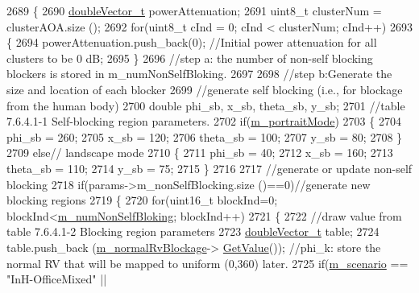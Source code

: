 \begin{DoxyCode}
2689 \{
2690         \hyperlink{namespacens3_aa6f1edf6566ca6afec613bc6e40240ea}{doubleVector\_t} powerAttenuation;
2691         uint8\_t clusterNum = clusterAOA.size ();
2692         \textcolor{keywordflow}{for}(uint8\_t cInd = 0; cInd < clusterNum; cInd++)
2693         \{
2694                 powerAttenuation.push\_back(0); \textcolor{comment}{//Initial power attenuation for all clusters to be 0 dB;}
2695         \}
2696         \textcolor{comment}{//step a: the number of non-self blocking blockers is stored in m\_numNonSelfBloking.}
2697 
2698         \textcolor{comment}{//step b:Generate the size and location of each blocker}
2699         \textcolor{comment}{//generate self blocking (i.e., for blockage from the human body)}
2700         \textcolor{keywordtype}{double} phi\_sb, x\_sb, theta\_sb, y\_sb;
2701         \textcolor{comment}{//table 7.6.4.1-1 Self-blocking region parameters.}
2702         \textcolor{keywordflow}{if}(\hyperlink{classns3_1_1MmWave3gppChannel_a013ed012d87114993312ccfd172fe377}{m\_portraitMode})
2703         \{
2704                 phi\_sb = 260;
2705                 x\_sb = 120;
2706                 theta\_sb = 100;
2707                 y\_sb = 80;
2708         \}
2709         \textcolor{keywordflow}{else}\textcolor{comment}{// landscape mode}
2710         \{
2711                 phi\_sb = 40;
2712                 x\_sb = 160;
2713                 theta\_sb = 110;
2714                 y\_sb = 75;
2715         \}
2716 
2717         \textcolor{comment}{//generate or update non-self blocking}
2718         \textcolor{keywordflow}{if}(params->m\_nonSelfBlocking.size ()==0)\textcolor{comment}{//generate new blocking regions}
2719         \{
2720                 \textcolor{keywordflow}{for}(uint16\_t blockInd=0; blockInd<\hyperlink{classns3_1_1MmWave3gppChannel_addfe5e6c9d8e2531fe165ff86461d2d3}{m\_numNonSelfBloking}; blockInd++)
2721                 \{
2722                         \textcolor{comment}{//draw value from table 7.6.4.1-2 Blocking region parameters}
2723                         \hyperlink{namespacens3_aa6f1edf6566ca6afec613bc6e40240ea}{doubleVector\_t} table;
2724                         table.push\_back (\hyperlink{classns3_1_1MmWave3gppChannel_a51e89a0f3902e6e377705871c479cf36}{m\_normalRvBlockage}->
      \hyperlink{classns3_1_1NormalRandomVariable_a0134d131477bc439cc6ff7cbe84b03a9}{GetValue}()); \textcolor{comment}{//phi\_k: store the normal RV that will be mapped to uniform (0,360) later.}
2725                         \textcolor{keywordflow}{if}(\hyperlink{classns3_1_1MmWave3gppChannel_ae1f263fbc87682905d563221343e4447}{m\_scenario} == \textcolor{stringliteral}{"InH-OfficeMixed"} || 

\end{DoxyCode}
